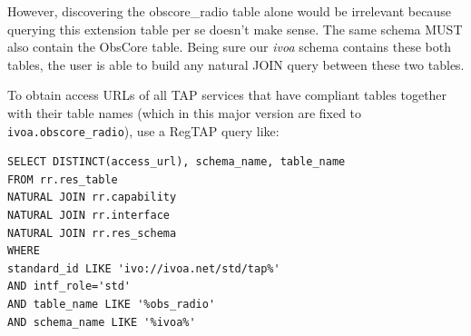\documentclass[11pt,a4paper]{ivoa}
\begin{document}
However, discovering the obscore\_radio table alone would be  irrelevant  because querying this
extension table per se doesn't make sense. The same schema MUST also contain the ObsCore table.   
Being sure our \textit{ivoa} schema  contains these both tables,
the user is able  to  build any natural JOIN query between these two tables. 




To obtain access URLs of all TAP services that have compliant tables
together with their table names (which in this major version are fixed
to \verb|ivoa.obscore_radio|), use a RegTAP \citep{2019ivoa.spec.1011D}
query like:

\begin{lstlisting}
SELECT DISTINCT(access_url), schema_name, table_name
FROM rr.res_table
NATURAL JOIN rr.capability
NATURAL JOIN rr.interface
NATURAL JOIN rr.res_schema
WHERE
standard_id LIKE 'ivo://ivoa.net/std/tap%'
AND intf_role='std'
AND table_name LIKE '%obs_radio'
AND schema_name LIKE '%ivoa%'
\end{lstlisting}



\appendix





\end{document}
